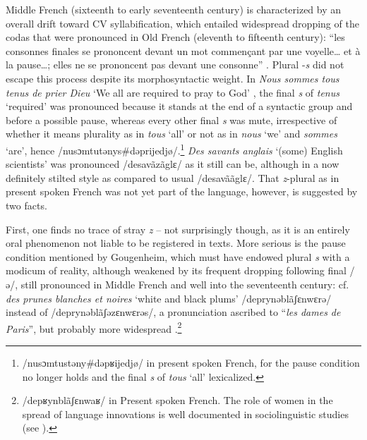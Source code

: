 \documentclass[output=paper]{langscibook}
\begin{document}
Middle French (sixteenth to early seventeenth century) is characterized by an overall drift toward CV syllabification, which entailed widespread dropping of the codas that were pronounced in Old French (eleventh to fifteenth century): “les consonnes finales se prononcent devant un mot commençant par une voyelle… et à la pause…; elles ne se prononcent pas devant une consonne” \citep[31]{Gougenheim1951}. Plural -\textit{s} did not escape this process despite its morphosyntactic weight. In \textit{Nous sommes tous tenus de prier Dieu} ‘We all are required to pray to God’ \citep[32]{Gougenheim1951}, the final \textit{s} of \textit{tenus} ‘required’ was pronounced because it stands at the end of a syntactic group and before a possible pause, whereas every other final \textit{s} was mute, irrespective of whether it means plurality as in \textit{tous} ‘all’ or not as in \textit{nous} `we' and \textit{sommes} ‘are’, hence /nusɔmtutənys\#dəprijedjø/.\footnote{/nusɔmtustəny\#dəpʁijedjø/ in present spoken French, for the pause condition no longer holds and the final \textit{s} of \textit{tous} ‘all’ lexicalized.} \textit{Des savants anglais} ‘(some) English scientists’ was pronounced /desavãzãglɛ/ as it still can be, although in a now definitely stilted style as compared to usual /desavããglɛ/. That \textit{z}{}-plural as in present spoken French was not yet part of the language, however, is suggested by two facts.

First, one finds no trace of stray \textit{z} -- not surprisingly though, as it is an entirely oral phenomenon not liable to be registered in texts. More serious is the pause condition mentioned by Gougenheim, which must have endowed plural \textit{s} with a modicum of reality, although weakened by its frequent dropping following final /ə/, still pronounced in Middle French and well into the seventeenth century: cf. \textit{des prunes blanches et noires} ‘white and black plums’ /deprynəblãʃɛnwɛrə/ instead of /deprynəblãʃəzɛnwɛrəs/, a pronunciation ascribed to “\textit{les dames de Paris}”, but probably more widespread \citep[33]{Gougenheim1951}.\footnote{/depʁynblãʃɛnwaʁ/ in Present spoken French. The role of women in the spread of language innovations is well documented in sociolinguistic studies (see \citealt{Labov2001}).}
\end{document}
